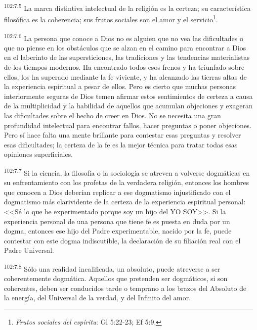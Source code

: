 \documentclass[twoside, 11pt]{book}
\begin{document}
\par
\textsuperscript{102:7.5} La marca distintiva intelectual de la religión es la certeza; su característica filosófica es la coherencia; sus frutos sociales son el amor y el servicio\footnote{\textit{Frutos sociales del espíritu}: Gl 5:22-23; Ef 5:9.}.

\par
\textsuperscript{102:7.6} La persona que conoce a Dios no es alguien que no vea las dificultades o que no piense en los obstáculos que se alzan en el camino para encontrar a Dios en el laberinto de las supersticiones, las tradiciones y las tendencias materialistas de los tiempos modernos. Ha encontrado todos esos frenos y ha triunfado sobre ellos, los ha superado mediante la fe viviente, y ha alcanzado las tierras altas de la experiencia espiritual a pesar de ellos. Pero es cierto que muchas personas interiormente seguras de Dios temen afirmar estos sentimientos de certeza a causa de la multiplicidad y la habilidad de aquellos que acumulan objeciones y exageran las dificultades sobre el hecho de creer en Dios. No se necesita una gran profundidad intelectual para encontrar fallos, hacer preguntas o poner objeciones. Pero sí hace falta una mente brillante para contestar esas preguntas y resolver esas dificultades; la certeza de la fe es la mejor técnica para tratar todas esas opiniones superficiales.

\par
\textsuperscript{102:7.7} Si la ciencia, la filosofía o la sociología se atreven a volverse dogmáticas en su enfrentamiento con los profetas de la verdadera religión, entonces los hombres que conocen a Dios deberían replicar a ese dogmatismo injustificado con el dogmatismo más clarividente de la certeza de la experiencia espiritual personal: <<Sé lo que he experimentado porque soy un hijo del YO SOY>>. Si la experiencia personal de una persona que tiene fe es puesta en duda por un dogma, entonces ese hijo del Padre experimentable, nacido por la fe, puede contestar con este dogma indiscutible, la declaración de su filiación real con el Padre Universal.

\par
\textsuperscript{102:7.8} Sólo una realidad incalificada, un absoluto, puede atreverse a ser coherentemente dogmática. Aquellos que pretenden ser dogmáticos, si son coherentes, deben ser conducidos tarde o temprano a los brazos del Absoluto de la energía, del Universal de la verdad, y del Infinito del amor.
\end{document}
